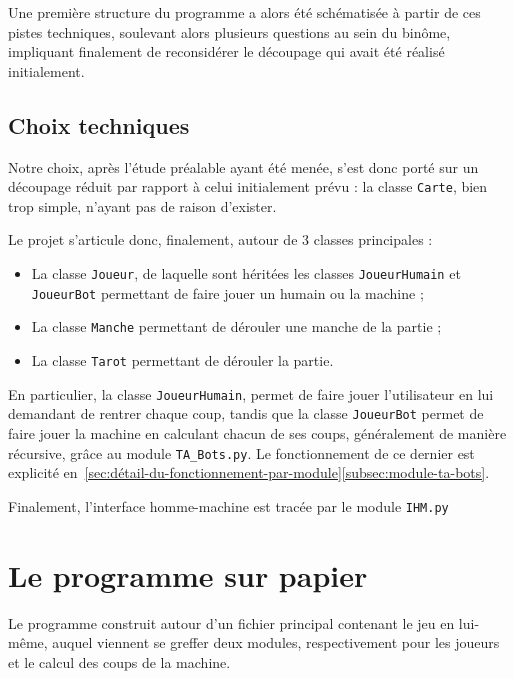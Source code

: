       Une première structure du programme a alors été schématisée à partir de ces pistes techniques, soulevant alors plusieurs questions au sein du binôme, impliquant finalement de reconsidérer le découpage qui avait été réalisé initialement.

   \subsection{Choix techniques}\label{subsec:choix-techniques}
      Notre choix, après l'étude préalable ayant été menée, s'est donc porté sur un découpage réduit par rapport à celui initialement prévu : la classe \texttt{Carte}, bien trop simple, n'ayant pas de raison d'exister.

      Le projet s'articule donc, finalement, autour de 3 classes principales :
      \begin{itemize}
         \item La classe \texttt{Joueur}, de laquelle sont héritées les classes \texttt{JoueurHumain} et \texttt{JoueurBot} permettant de faire jouer un humain ou la machine ;
         \item La classe \texttt{Manche} permettant de dérouler une manche de la partie ;
         \item La classe \texttt{Tarot} permettant de dérouler la partie.
      \end{itemize}

      En particulier, la classe \texttt{JoueurHumain}, permet de faire jouer l'utilisateur en lui demandant de rentrer chaque coup, tandis que la classe \texttt{JoueurBot} permet de faire jouer la machine en calculant chacun de ses coups, généralement de manière récursive, grâce au module \texttt{TA\_Bots.py}.
      Le fonctionnement de ce dernier est explicité en~\ref{sec:détail-du-fonctionnement-par-module}\ref{subsec:module-ta-bots}.

      Finalement, l'interface homme-machine est tracée par le module \texttt{IHM.py}


\section{Le programme sur papier}\label{sec:le-programme-sur-papier}
   Le programme construit autour d'un fichier principal contenant le jeu en lui-même, auquel viennent se greffer deux modules, respectivement pour les joueurs et le calcul des coups de la machine.

